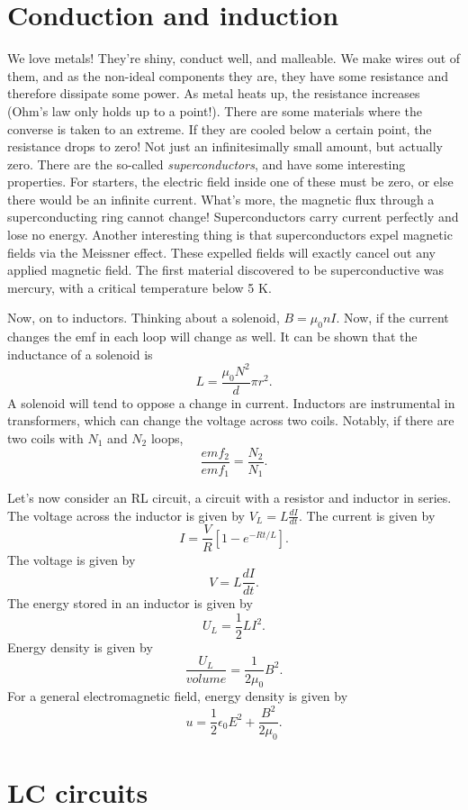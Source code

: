 \documentclass[nobib]{tufte-handout}
\begin{document}
\section{Conduction and induction}
We love metals! They're shiny, conduct well, and malleable. We make wires out of them, and 
as the non-ideal components they are, they have some resistance and therefore dissipate some 
power. As metal heats up, the resistance increases (Ohm's law only holds up to a point!). There 
are some materials where the converse is taken to an extreme. If they are cooled below a certain 
point, the resistance drops to zero! Not just an infinitesimally small amount, but actually zero. 
There are the so-called \emph{superconductors}, and have some interesting properties. For starters, 
the electric field inside one of these must be zero, or else there would be an infinite current. 
What's more, the magnetic flux through a superconducting ring cannot change! Superconductors carry 
current perfectly and lose no energy. Another interesting thing is that superconductors expel 
magnetic fields via the Meissner effect. These expelled fields will exactly cancel out any applied 
magnetic field. The first material discovered to be superconductive was mercury, with a critical temperature
below 5 K. 

Now, on to inductors. Thinking about a solenoid, $B= \mu_0 n I$. Now, if the current changes
the emf in each loop will change as well. It can be shown that the inductance of a solenoid is
\[L=\frac{\mu_0 N^2}{d} \pi r^2.\]
A solenoid will tend to oppose a change in current. Inductors are instrumental in transformers, 
which can change the voltage across two coils. Notably, if there are two coils with $N_1$ and $N_2$ loops, 
\[\frac{emf_{2}}{emf_{1}} = \frac{N_2}{N_1}.\]

Let's now consider an RL circuit, a circuit with a resistor and inductor in series. The voltage 
across the inductor is given by $V_L = L \frac{dI}{dt}$. The current is given by 
\[I = \frac{V}{R}\left[1-e^{-Rt/L}\right].\]
The voltage is given by 
\[V = L\frac{dI}{dt}.\]
The energy stored in an inductor is given by 
\[U_L = \frac{1}{2}LI^2.\]
Energy density is given by 
\[\frac{U_L}{volume} = \frac{1}{2\mu_0} B^2.\]
For a general electromagnetic field, energy density is given by 
\[u = \frac{1}{2}\epsilon_0 E^2 + \frac{B^2}{2 \mu_0}.\]

\section{LC circuits}
\end{document}
